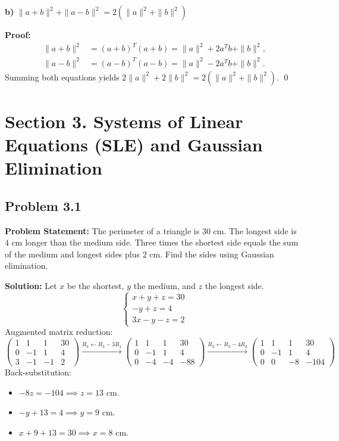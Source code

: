 \documentclass[11pt, a4paper]{article}
\begin{document}
\medskip
\textbf{b)} $\|a+b\|^2 + \|a-b\|^2 = 2(\|a\|^2 + \|b\|^2)$

\textbf{Proof:}
\begin{align*}
\|a+b\|^2 &= (a+b)^T(a+b) = \|a\|^2 + 2a^T b + \|b\|^2, \\
\|a-b\|^2 &= (a-b)^T(a-b) = \|a\|^2 - 2a^T b + \|b\|^2.
\end{align*}
Summing both equations yields $2\|a\|^2 + 2\|b\|^2 = 2(\|a\|^2 + \|b\|^2)$. \qed

\newpage

\section{Section 3. Systems of Linear Equations (SLE) and Gaussian Elimination}

\subsection*{Problem 3.1}
\textbf{Problem Statement:} The perimeter of a triangle is $30\text{ cm}$. The longest side is $4\text{ cm}$ longer than the medium side. Three times the shortest side equals the sum of the medium and longest sides plus $2\text{ cm}$. Find the sides using Gaussian elimination.

\textbf{Solution:}
Let $x$ be the shortest, $y$ the medium, and $z$ the longest side.
$$ \begin{cases} x + y + z = 30 \\ -y + z = 4 \\ 3x - y - z = 2 \end{cases} $$
Augmented matrix reduction:
$$ \left(\begin{array}{ccc|c} 1 & 1 & 1 & 30 \\ 0 & -1 & 1 & 4 \\ 3 & -1 & -1 & 2 \end{array}\right) \xrightarrow{R_3 \leftarrow R_3 - 3R_1} \left(\begin{array}{ccc|c} 1 & 1 & 1 & 30 \\ 0 & -1 & 1 & 4 \\ 0 & -4 & -4 & -88 \end{array}\right) \xrightarrow{R_3 \leftarrow R_3 - 4R_2} \left(\begin{array}{ccc|c} 1 & 1 & 1 & 30 \\ 0 & -1 & 1 & 4 \\ 0 & 0 & -8 & -104 \end{array}\right) $$
Back-substitution:
\begin{itemize}
\item $-8z = -104 \implies z = 13\text{ cm}$.
\item $-y + 13 = 4 \implies y = 9\text{ cm}$.
\item $x + 9 + 13 = 30 \implies x = 8\text{ cm}$.
\end{itemize}
\end{document}
